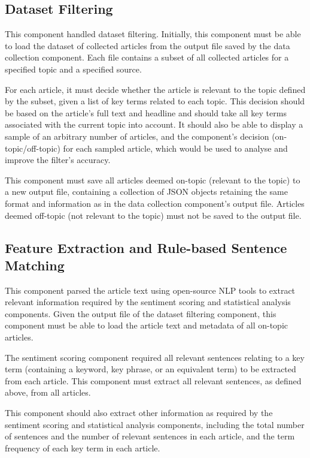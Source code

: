 \documentclass{report}
\begin{document}
\subsection{Dataset Filtering} \label{req-filtering}

This component handled dataset filtering.
Initially, this component must be able to load the dataset of collected articles from the output file saved by the data collection component.
Each file contains a subset of all collected articles for a specified topic and a specified source.

For each article, it must decide whether the article is relevant to the topic defined by the subset, given a list of key terms related to each topic.
This decision should be based on the article's full text and headline and should take all key terms associated with the current topic into account.
It should also be able to display a sample of an arbitrary number of articles, and the component's decision (on-topic/off-topic) for each sampled article, which would be used to analyse and improve the filter's accuracy.

This component must save all articles deemed on-topic (relevant to the topic) to a new output file, containing a collection of JSON objects retaining the same format and information as in the data collection component's output file.
Articles deemed off-topic (not relevant to the topic) must not be saved to the output file.

\subsection{Feature Extraction and Rule-based Sentence Matching} \label{req-matching}

This component parsed the article text using open-source NLP tools to extract relevant information required by the sentiment scoring and statistical analysis components.
Given the output file of the dataset filtering component, this component must be able to load the article text and metadata of all on-topic articles.

The sentiment scoring component required all relevant sentences relating to a key term (containing a keyword, key phrase, or an equivalent term) to be extracted from each article.
This component must extract all relevant sentences, as defined above, from all articles.

This component should also extract other information as required by the sentiment scoring and statistical analysis components, including the total number of sentences and the number of relevant sentences in each article, and the term frequency of each key term in each article.
\end{document}
